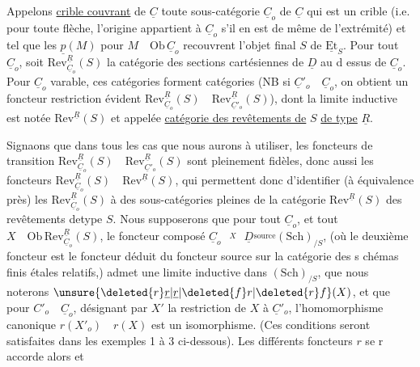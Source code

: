Appelons \uline{crible couvrant} de $\underline{C}$ toute sous-catégorie  $\underline{C}_o$ de $\underline{C}$ qui est un crible (i.e. pour toute flèche, l'origine appartient à $\underline{C}_o$ s'il en est de même de l'extrémité) et tel que les $\underline{p}(M)$ pour $M\quad\mathrm{Ob}\,\underline{C}_o$ recouvrent l'objet final $S$ de $\underline{\mathrm{Et}}_S$. Pour tout $\underline{C}_o$, soit $\mathrm{Rev}^{\underline{R}}_{\underline{C}_o}(S)$ la catégorie des sections cartésiennes de $\underline{D}$ au d essus de $\underline{C}_o$. Pour $\underline{C}_o$ varable, ces catégories forment  catégories (NB si $\underline{C}'_o\quad\underline{C}_o$, on obtient un foncteur restriction évident $\mathrm{Rev}^{\underline{R}}_{\underline{C}_o}(S)\quad\mathrm{Rev}^{\underline{R}}_{\underline{C}'_o}(S)$),  dont la limite inductive est notée $\mathrm{Rev}^{\underline{R}}(S)$ et appelée \uline{catégorie des revêtements de} $S$ \uline{de type} $\underline{R}$.

Signaons que dans tous les cas que nous aurons à utiliser, les foncteurs de transition $\mathrm{Rev}^{\underline{R}}_{\underline{C}_o}(S)\quad\mathrm{Rev}^{\underline{R}}_{\underline{C}'_o}(S)$ sont pleinement fidèles, donc aussi les foncteurs $\mathrm{Rev}^{\underline{R}}_{\underline{C}_o}(S)\quad\mathrm{Rev}^{\underline{R}}(S)$, qui permettent donc d'identifier (à équivalence près) les $\mathrm{Rev}^{\underline{R}}_{\underline{C}_o}(S)$ à des sous-catégories pleines de la catégorie $\mathrm{Rev}^{\underline{R}}(S)$ des revêtements detype $S$. Nous supposerons  que pour tout $\underline{C}_o$,  et tout $X\quad\mathrm{Ob}\,\mathrm{Rev}^{\underline{R}}_{\underline{C}_o}(S)$, le foncteur composé $\underline{C}_o\overset{X}{\qquad}\underline{D}\overset{\mathrm{source}}{\qquad}(\mathrm{Sch})_{/S}$, (où le deuxième foncteur est le foncteur déduit du foncteur source sur la catégorie des s chémas finis étales relatifs,) admet une limite inductive dans $(\mathrm{Sch})_{/S}$, que nous noterons $\unsure{\deleted{r}\underline{r}|\underline{r}|\deleted{f}r|\deleted{r}f}(X)$, et que pour $C'_o\quad\underline{C}_o$, désignant par $X'$ la restriction de $X$ à $\underline{C}'_o$, l'homomorphisme canonique $r(X'_o)\quad r(X)$ est un isomorphisme. (Ces conditions seront satisfaites dans les exemples  1 à 3 ci-dessous). Les différents foncteurs $r$ se r accorde alors et

